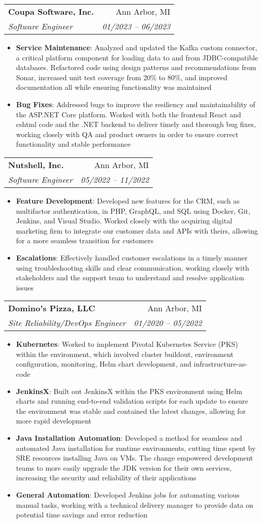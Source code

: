 \documentclass[letterpaper,10pt]{article}
\makeatletter
\newcommand{\resumeItem}[2]{
  \item\small{
    \textbf{#1}{: #2 \vspace{-2pt}}
  }
}
\newcommand{\resumeSubheading}[4]{
  \vspace{-1pt}\item
    \begin{tabular*}{0.97\textwidth}[t]{l@{\extracolsep{\fill}}r}
      \textbf{#1} & #2 \\
      \textit{\small#3} & \textit{\small #4} \\
    \end{tabular*}\vspace{-5pt}
}
\newcommand{\resumeItemListStart}{\begin{itemize}}
\newcommand{\resumeItemListEnd}{\end{itemize}\vspace{-5pt}}
\makeatother
\begin{document}
    \resumeSubheading
      {Coupa Software, Inc.}{Ann Arbor, MI}
      {Software Engineer}{01/2023 -- 06/2023}
      \resumeItemListStart
        \resumeItem{Service Maintenance}
          {Analyzed and updated the Kafka custom connector, a critical platform component for loading data to and from 
          JDBC-compatible databases. Refactored code using design patterns and recommendations from Sonar, increased 
          unit test coverage from 20\% to 80\%, and improved documentation all while ensuring functionality was maintained}
        \resumeItem{Bug Fixes}
          {Addressed bugs to improve the resiliency and maintainability of the ASP.NET Core platform. Worked with both 
          the frontend React and cshtml code and the .NET backend to deliver timely and thorough bug fixes, working closely with 
          QA and product owners in order to ensure correct functionality and stable performance}
      \resumeItemListEnd
    
    \resumeSubheading
      {Nutshell, Inc.}{Ann Arbor, MI}
      {Software Engineer}{05/2022 -- 11/2022}
      \resumeItemListStart
        \resumeItem{Feature Development}
          {Developed new features for the CRM, such as multifactor authentication, in PHP, GraphQL, and SQL using 
          Docker, Git, Jenkins, and Visual Studio. Worked closely with the acquiring digital marketing firm to 
          integrate our customer data and APIs with theirs, allowing for a more seamless transition for customers}
        \resumeItem{Escalations}
          {Effectively handled customer escalations in a timely manner using troubleshooting skills and clear communication, 
          working closely with stakeholders and the support team to understand and resolve application issues}
      \resumeItemListEnd

    \resumeSubheading
      {Domino's Pizza, LLC}{Ann Arbor, MI}
      {Site Reliability/DevOps Engineer}{01/2020 -- 05/2022}
      \resumeItemListStart
        \resumeItem{Kubernetes}
          {Worked to implement Pivotal Kubernetes Service (PKS) within the environment, which involved cluster buildout, 
          environment configuration, monitoring, Helm chart development, and infrastructure-as-code}
        \resumeItem{JenkinsX}
          {Built out JenkinsX within the PKS environment using Helm charts and running end-to-end validation scripts 
          for each update to ensure the environment was stable and contained the latest changes, allowing for more rapid development}
        \resumeItem{Java Installation Automation}
          {Developed a method for seamless and automated Java installation for runtime environments, 
          cutting time spent by SRE resources installing Java on VMs. The change empowered development teams 
          to more easily upgrade the JDK version for their own services, increasing the security and reliability of their applications}
        \resumeItem{General Automation}
          {Developed Jenkins jobs for automating various manual tasks, working with a technical delivery manager 
          to provide data on potential time savings and error reduction}
      \resumeItemListEnd
\end{document}
